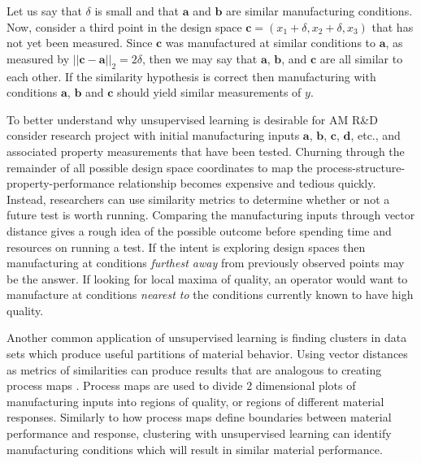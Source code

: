 Let us say that $\delta$ is small and that $\mathbf{a}$ and $\mathbf{b}$ are similar manufacturing conditions.
Now, consider a third point in the design space $\mathbf{c} = (x_{1} + \delta, x_2 + \delta, x_3)$ that has not yet been measured.
Since $\mathbf{c}$ was manufactured at similar conditions to $\mathbf{a}$, as measured by $||\mathbf{c} - \mathbf{a}||_2 = 2\delta$, then we may say that $\mathbf{a}$, $\mathbf{b}$, and $\mathbf{c}$ are all similar to each other. If the similarity hypothesis is correct then manufacturing with conditions $\mathbf{a}$, $\mathbf{b}$ and $\mathbf{c}$ should yield similar measurements of $y$.

To better understand why unsupervised learning is desirable for AM R\&D consider research project with initial manufacturing inputs $\mathbf{a}$, $\mathbf{b}$, $\mathbf{c}$, $\mathbf{d}$, etc., and associated property measurements that have been tested. Churning through the remainder of all possible design space coordinates to map the process-structure-property-performance relationship becomes expensive and tedious quickly. Instead, researchers can use similarity metrics to determine whether or not a future test is worth running. Comparing the manufacturing inputs through vector distance gives a rough idea of the possible outcome before spending time and resources on running a test. If the intent is exploring design spaces then manufacturing at conditions \textit{furthest away} from previously observed points may be the answer. If looking for local maxima of quality, an operator would want to manufacture at conditions \textit{nearest to} the conditions currently known to have high quality.

Another common application of unsupervised learning is finding clusters in data sets which produce useful partitions of material behavior. Using vector distances as metrics of similarities can produce results that are analogous to creating process maps \cite{Beuth2001}. Process maps are used to divide $2$ dimensional plots of manufacturing inputs into regions of quality, or regions of different material responses. Similarly to how process maps define boundaries between material performance and response, clustering with unsupervised learning can identify manufacturing conditions which will result in similar material performance.



